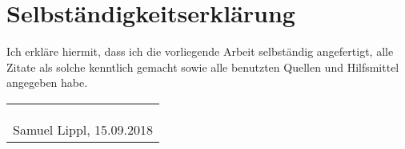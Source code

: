 \setcounter{page}{2}

\chapter*{Selbständigkeitserklärung}

Ich erkläre hiermit, dass ich die vorliegende Arbeit selbständig angefertigt, alle Zitate als solche kenntlich gemacht sowie alle benutzten Quellen und Hilfsmittel angegeben habe.\\

\begin{tabular}{c}
\\\\\\
\\\hline
Samuel Lippl, 15.09.2018
\end{tabular}